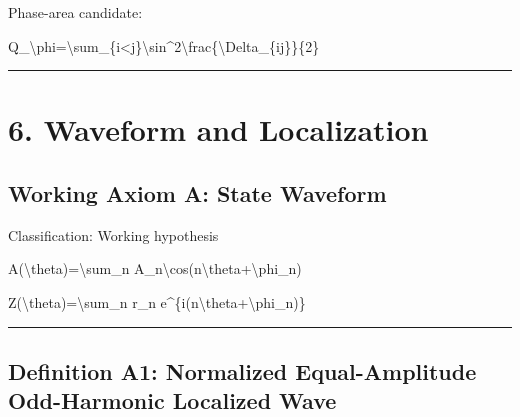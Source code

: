 \documentclass[
  a4paper]{article}
\newenvironment{Shaded}{}{}
\newcommand{\NormalTok}[1]{#1}
\begin{document}
Phase-area candidate:

\begin{Shaded}
\begin{Highlighting}[]
\NormalTok{Q\_\textbackslash{}phi=\textbackslash{}sum\_\{i\textless{}j\}\textbackslash{}sin\^{}2\textbackslash{}frac\{\textbackslash{}Delta\_\{ij\}\}\{2\}}
\end{Highlighting}
\end{Shaded}

\begin{center}\rule{0.5\linewidth}{0.5pt}\end{center}

\section{6. Waveform and Localization}\label{waveform-and-localization}

\subsection{Working Axiom A: State
Waveform}\label{working-axiom-a-state-waveform}

Classification: Working hypothesis

\begin{Shaded}
\begin{Highlighting}[]
\NormalTok{A(\textbackslash{}theta)=\textbackslash{}sum\_n A\_n\textbackslash{}cos(n\textbackslash{}theta+\textbackslash{}phi\_n)}
\end{Highlighting}
\end{Shaded}

\begin{Shaded}
\begin{Highlighting}[]
\NormalTok{Z(\textbackslash{}theta)=\textbackslash{}sum\_n r\_n e\^{}\{i(n\textbackslash{}theta+\textbackslash{}phi\_n)\}}
\end{Highlighting}
\end{Shaded}

\begin{center}\rule{0.5\linewidth}{0.5pt}\end{center}

\subsection{Definition A1: Normalized Equal-Amplitude Odd-Harmonic
Localized
Wave}\label{definition-a1-normalized-equal-amplitude-odd-harmonic-localized-wave}
\end{document}
